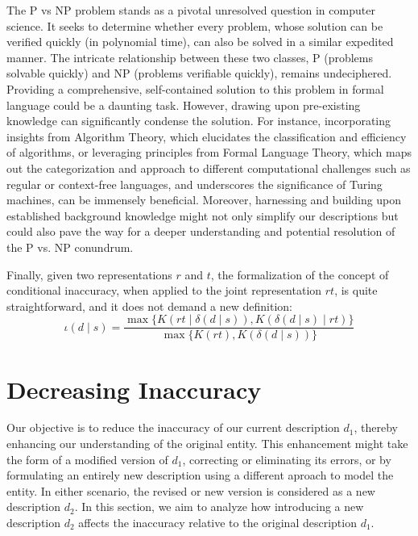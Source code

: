 \begin{example}
The P vs NP problem stands as a pivotal unresolved question in computer science. It seeks to determine whether every problem, whose solution can be verified quickly (in polynomial time), can also be solved in a similar expedited manner. The intricate relationship between these two classes, P (problems solvable quickly) and NP (problems verifiable quickly), remains undeciphered. Providing a comprehensive, self-contained solution to this problem in formal language could be a daunting task. However, drawing upon pre-existing knowledge can significantly condense the solution. For instance, incorporating insights from Algorithm Theory, which elucidates the classification and efficiency of algorithms, or leveraging principles from Formal Language Theory, which maps out the categorization and approach to different computational challenges such as regular or context-free languages, and underscores the significance of Turing machines, can be immensely beneficial. Moreover, harnessing and building upon established background knowledge might not only simplify our descriptions but could also pave the way for a deeper understanding and potential resolution of the P vs. NP conundrum.

\end{example}

Finally, given two representations $r$ and $t$, the formalization of the concept of conditional inaccuracy, when applied to the joint representation $rt$, is quite straightforward, and it does not demand a new definition:
\[
\iota(d \mid s) = \frac{ \max\{ K \left(rt \mid \delta(d \mid s) \right), K \left( \delta(d \mid s) \mid rt \right) \} } { \max\{ K(rt), K \left(\delta(d \mid s) \right) \} }
\]


%
%

\section{Decreasing Inaccuracy}

Our objective is to reduce the inaccuracy of our current description $d_1$, thereby enhancing our understanding of the original entity. This enhancement might take the form of a modified version of $d_1$, correcting or eliminating its errors, or by formulating an entirely new description using a different aproach to model the entity. In either scenario, the revised or new version is considered as a new description $d_2$. In this section, we aim to analyze how introducing a new description $d_2$ affects the inaccuracy relative to the original description $d_1$.

